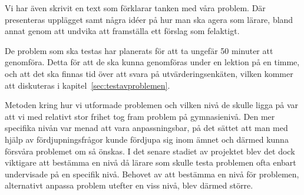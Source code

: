 \textcolor{lila}{Vi har även skrivit en text som förklarar tanken med våra problem. Där presenteras upplägget samt några idéer på hur man ska agera som lärare, bland annat genom att undvika att framställa ett förslag som felaktigt.}

\textcolor{lila}{De problem som ska testas har planerats för att ta ungefär 50 minuter att genomföra. Detta för att de ska kunna genomföras under en lektion på en timme, och att det ska finnas tid över att svara på utvärderingsenkäten, vilken kommer att diskuteras i kapitel~\ref{sec:testavproblemen}.}

\textcolor{Mahogany}{Metoden kring hur vi utformade problemen och vilken nivå de skulle ligga på var att vi med relativt stor frihet tog fram problem på gymnasienivå.
Den mer specifika nivån var menad att vara anpassningsbar, på det sättet att man med hjälp av fördjupningsfrågor kunde fördjupa sig inom ämnet och därmed kunna försvåra problemet om så önskas.
I det senare stadiet av projektet blev det dock viktigare att bestämma en nivå då lärare som skulle testa problemen ofta enbart undervisade på en specifik nivå. Behovet av att bestämma en nivå för problemen, alternativt anpassa problem utefter en viss nivå, blev därmed större.}
